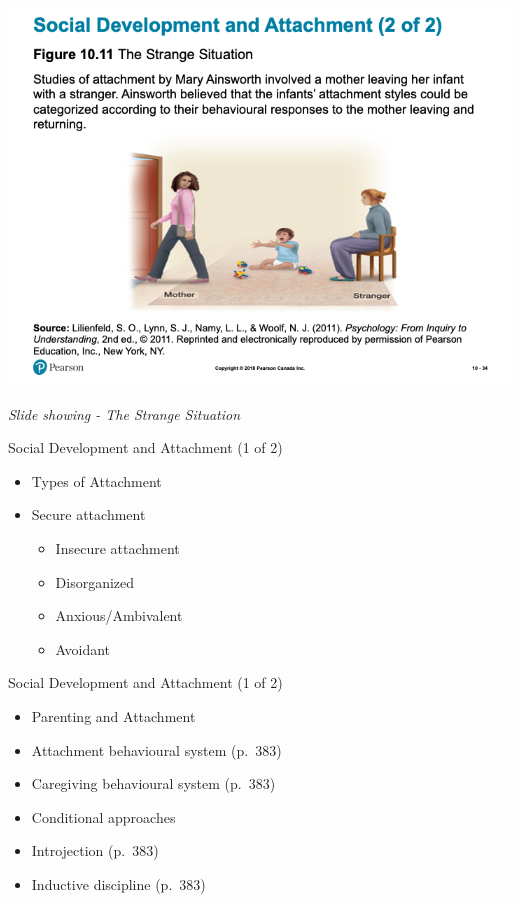\documentclass[
]{book}
\providecommand{\tightlist}{%
  \setlength{\itemsep}{0pt}\setlength{\parskip}{0pt}}
\begin{document}
\begin{reflect}
\includegraphics{assets/unit_3/slide_34.png}

\emph{Slide showing - The Strange Situation}

Social Development and Attachment (1 of 2)

\begin{itemize}
\tightlist
\item
  Types of Attachment\\
\item
  Secure attachment

  \begin{itemize}
  \tightlist
  \item
    Insecure attachment\\
  \item
    Disorganized\\
  \item
    Anxious/Ambivalent\\
  \item
    Avoidant
  \end{itemize}
\end{itemize}

Social Development and Attachment (1 of 2)

\begin{itemize}
\tightlist
\item
  Parenting and Attachment\\
\item
  Attachment behavioural system (p.~383)\\
\item
  Caregiving behavioural system (p.~383)\\
\item
  Conditional approaches\\
\item
  Introjection (p.~383)\\
\item
  Inductive discipline (p.~383)
\end{itemize}


\end{reflect}
\end{document}
